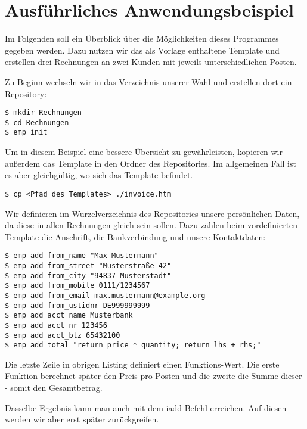 

\section{Ausführliches Anwendungsbeispiel}
Im Folgenden soll ein Überblick über die Möglichkeiten dieses Programmes gegeben werden. Dazu nutzen wir das als Vorlage enthaltene Template und erstellen drei Rechnungen an zwei Kunden mit jeweils unterschiedlichen Posten.

Zu Beginn wechseln wir in das Verzeichnis unserer Wahl und erstellen dort ein Repository:
\begin{lstlisting}[style=Bash]
$ mkdir Rechnungen
$ cd Rechnungen
$ emp init
\end{lstlisting}

Um in diesem Beispiel eine bessere Übersicht zu gewährleisten, kopieren wir außerdem das Template in den Ordner des Repositories. Im allgemeinen Fall ist es aber gleichgültig, wo sich das Template befindet.
\begin{lstlisting}[style=Bash]
$ cp <Pfad des Templates> ./invoice.htm
\end{lstlisting}


Wir definieren im Wurzelverzeichnis des Repositories unsere persönlichen Daten, da diese in allen Rechnungen gleich sein sollen. Dazu zählen beim vordefinierten Template die Anschrift, die Bankverbindung und unsere Kontaktdaten:

\begin{lstlisting}[style=Bash]
$ emp add from_name "Max Mustermann"
$ emp add from_street "Musterstraße 42"
$ emp add from_city "94837 Musterstadt"
$ emp add from_mobile 0111/1234567
$ emp add from_email max.mustermann@example.org
$ emp add from_ustidnr DE999999999
$ emp add acct_name Musterbank
$ emp add acct_nr 123456
$ emp add acct_blz 65432100
$ emp add total "return price * quantity; return lhs + rhs;"
\end{lstlisting}

Die letzte Zeile in obrigen Listing definiert einen Funktions-Wert. Die erste Funktion berechnet später den Preis pro Posten und die zweite die Summe dieser - somit den Gesamtbetrag.

Dasselbe Ergebnis kann man auch mit dem iadd-Befehl erreichen. Auf diesen werden wir aber erst später zurückgreifen.

